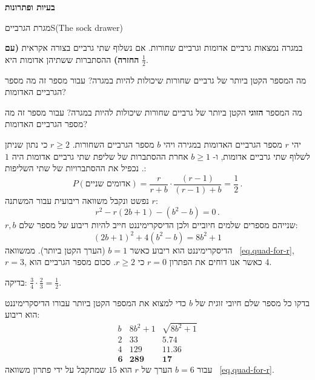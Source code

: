 


\begin{center}
\textbf{\Large בעיות ופתרונות}
\end{center}


\begin{prob}{מגרת הגרביים}{S}{(The sock drawer)}

במגרה נמצאות גרביים אדומות וגרביים שחורות. אם נשלוף שתי גרביים בצורה אקראית
\textbf{(עם החזרה)}
ההסתברות ששתיהן אדומות היא
$\frac{1}{2}$. 

מה המספר הקטן ביותר של גרביים שחורות שיכולות להיות במגרה? עבור מספר זה מה מספר הגרביים האדומות?

מה המספר 
\textbf{הזוגי}
הקטן ביותר של גרביים שחורות שיכולות להיות במגרה? עבור מספר זה מה מספר הגרביים האדומות?

\end{prob}


יהי
$r$
מספר הגרביים האדומות במגירה ויהי 
$b$
מספר הגרביים השחורות. 
$r\geq 2$
כי נתון שניתן לשלוף שתי גרביים אדומות, ו-%
$b\geq 1$
אחרת ההסתברות של שליפת שתי גרביים אדומות היה 
$1$.
נכפיל את ההסתברויות של שתי השליפות:
\begin{equation}\label{eq.1-a}
P(\textrm{אדומים שניים})=\frac{r}{r+b} \cdot \frac{(r-1)}{(r-1)+b} = \frac{1}{2}\,.
\end{equation}
נפשט ונקבל משוואה ריבועית עבור המשתנה 
$r$:
\begin{equation}\label{eq.quad-for-r}
r^2-r(2b+1)-(b^2-b)=0\,.
\end{equation}
$r,b$
שנייהם מספרים שלמים חיוביים ולכן הדיסקרימיננט חייב להיות ריבוע של מספר שלם:
\begin{equation}\label{eq.discriminant}
(2b+1)^2+4(b^2-b)=8b^2+1
\end{equation}
הדיסקרימיננט הוא ריבוע כאשר 
$b=1$
(הערך הקטן ביותר). ממשוואה%
~\ref{eq.quad-for-r}, $r=3$,
כאשר אנו דוחים את הפתרון 
$r=0$
כי
$r\geq 2$.
סכום מספר הגרביים הוא 
$4$.

בדיקה:
$\frac{3}{4}\cdot\frac{2}{3}=\frac{1}{2}$.

\medskip

בדקו כל מספר שלם חיובי זוגית של 
$b$
כדי למצוא את המספר הקטן ביותר עבורו הדיסקרימיננט הוא ריבוע:
\begin{displaymath}
\renewcommand{\arraystretch}{1}
\begin{array}{r|r|r}
b&8b^2+1&\sqrt{8b^2+1}\\
\hline
2&33&5.74\\
4&129&11.36\\
\mathbf{6}&\mathbf{289}&\mathbf{17}
\end{array}
\end{displaymath}
עבור
$b=6$ 
הערך של 
$r$
הוא
$15$
שמתקבל על ידי פתרון משוואה%
~\ref{eq.quad-for-r}.

